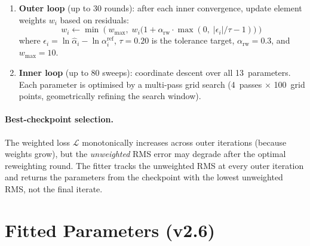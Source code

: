 \documentclass[11pt,letterpaper]{article}
\begin{document}
\begin{enumerate}
\item \textbf{Outer loop} (up to 30 rounds): after each inner
  convergence, update element weights $w_i$ based on residuals:
  \[
    w_i \leftarrow \min\!\left(w_{\max},\;
    w_i\bigl(1 + \alpha_{\mathrm{rw}} \cdot
    \max(0,\;|\epsilon_i|/\tau - 1)\bigr)\right)
  \]
  where $\epsilon_i = \ln\hat\alpha_i - \ln\alpha_i^{\mathrm{ref}}$,
  $\tau = 0.20$ is the tolerance target, $\alpha_{\mathrm{rw}} = 0.3$,
  and $w_{\max} = 10$.

\item \textbf{Inner loop} (up to 80 sweeps): coordinate descent over
  all 13~parameters.  Each parameter is optimised by a multi-pass grid
  search (4~passes $\times$ 100~grid points, geometrically refining the
  search window).
\end{enumerate}

\paragraph{Best-checkpoint selection.}
The weighted loss $\mathcal{L}$ monotonically increases across outer
iterations (because weights grow), but the \emph{unweighted} RMS error
may degrade after the optimal reweighting round.  The fitter tracks
the unweighted RMS at every outer iteration and returns the parameters
from the checkpoint with the lowest unweighted RMS, not the final
iterate.

\section{Fitted Parameters (v2.6)}
\label{sec:params}
\end{document}
